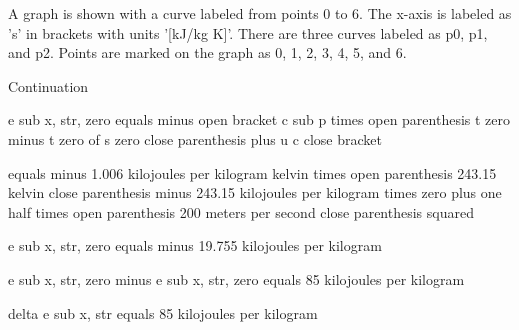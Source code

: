 A graph is shown with a curve labeled from points 0 to 6. The x-axis is labeled as 's' in brackets with units '[kJ/kg K]'. There are three curves labeled as p0, p1, and p2. Points are marked on the graph as 0, 1, 2, 3, 4, 5, and 6.

Continuation

e sub x, str, zero equals minus open bracket c sub p times open parenthesis t zero minus t zero of s zero close parenthesis plus u c close bracket

equals minus 1.006 kilojoules per kilogram kelvin times open parenthesis 243.15 kelvin close parenthesis minus 243.15 kilojoules per kilogram times zero plus one half times open parenthesis 200 meters per second close parenthesis squared

e sub x, str, zero equals minus 19.755 kilojoules per kilogram

e sub x, str, zero minus e sub x, str, zero equals 85 kilojoules per kilogram

delta e sub x, str equals 85 kilojoules per kilogram